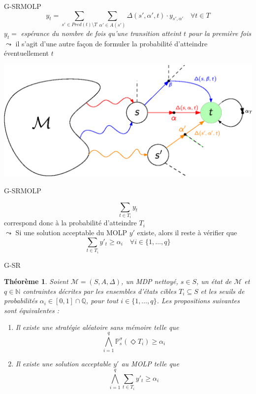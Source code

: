 \documentclass[compress]{beamer}
\theoremstyle{theorem}%
\newtheorem{theoreme}{Théorème}
\begin{document}
\begin{frame}{G-SR}{MOLP}
  \small
    \vspace{-0.05\linewidth}
    \begin{equation*}
      y_t = \sum_{s' \in Pred(t) \setminus T} \sum_{\alpha'\in A(s')} \Delta(s', \alpha', t) \cdot y_{s', \alpha'} \quad \forall t \in T
    \end{equation*}
    $y_t = $ \textit{espérance du nombre de fois qu'une transition atteint $t$ {\color{fibeamer@orange}pour la première fois}} \\
    $\leadsto$ il s'agit d'une autre façon de formuler la probabilité d'atteindre éventuellement $t$
  \begin{center}
    \includegraphics[width=0.7\linewidth]{resources/MOLP1}
  \end{center}
\end{frame}

\begin{frame}{G-SR}{MOLP}
\begin{center}
\[ \sum_{t \in T_i} y_t \]
correspond donc à la probabilité d'atteindre $T_i$ \\
{\color{fibeamer@blue}$\leadsto$} Si une solution acceptable du MOLP $y'$ existe, alors il reste à vérifier que
\[
  \sum_{t \in T_i} y'_t \geq \alpha_i \quad \forall i \in \{1, \dots, q\}
\]
\end{center}
\end{frame}

\begin{frame}{G-SR}
  \vspace{-0.05\linewidth}
  \begin{theoreme}
    \footnotesize
    Soient $\mathcal{M} = (S, A, \Delta)$, un MDP nettoyé, $s \in S$, un état de $\mathcal{M}$ et $q \in \mathbb{N}$
    contraintes décrites par les ensembles d'états cibles $T_i \subseteq S$ et
    les seuils de probabilités $\alpha_i \in [0, 1] \cap \mathbb{Q}$, pour tout $i \in \{1, \dots, q\}$. Les propositions suivantes sont équivalentes :
    \begin{enumerate}
      \item[$(1.)$] Il existe une stratégie aléatoire sans mémoire telle que
        \[
          \bigwedge_{i=1}^q \mathbb{P}_s^\sigma (\Diamond T_i) \geq \alpha_i
        \]
      \item[$(2.)$] Il existe une solution acceptable $y'$ au MOLP telle que
        \[
          \bigwedge_{i=1}^q \sum_{t \in T_i} y'_{t} \geq \alpha_i
        \]
    \end{enumerate}
  \end{theoreme}
\end{frame}
\end{document}

